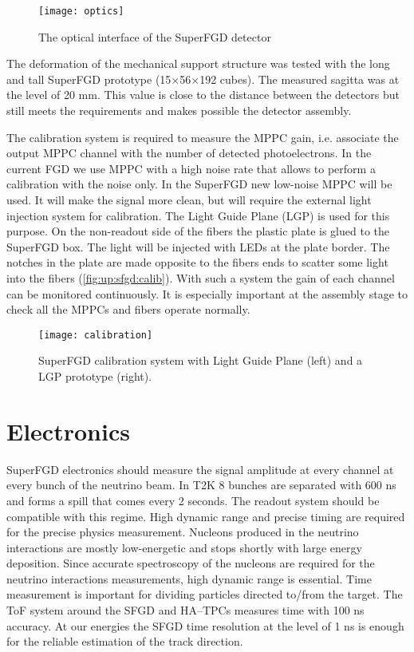 \documentclass[main.tex]{subfiles}
\begin{document}
\begin{figure}[!ht]
	\centering
	\texttt{[image: optics]}
	\caption{The optical interface of the SuperFGD detector}
	\label{fig:up:sfgd:optics}
\end{figure}

The deformation of the mechanical support structure was tested with the long and tall SuperFGD prototype (15$\times$56$\times$192 cubes). The measured sagitta was at the level of 20 mm. This value is close to the distance between the detectors but still meets the requirements and makes possible the detector assembly.

The calibration system is required to measure the MPPC gain, i.e. associate the output MPPC channel with the number of detected photoelectrons. In the current FGD we use MPPC with a high noise rate that allows to perform a calibration with the noise only. In the SuperFGD new low-noise MPPC will be used. It will make the signal more clean, but will require the external light injection system for calibration. The Light Guide Plane (LGP) is used for this purpose. On the non-readout side of the fibers the plastic plate is glued to the SuperFGD box. The light will be injected with LEDs at the plate border. The notches in the plate are made opposite to the fibers ends to scatter some light into the fibers (\autoref{fig:up:sfgd:calib}). With such a system the gain of each channel can be monitored continuously. It is especially important at the assembly stage to check all the MPPCs and fibers operate normally.

\begin{figure}[!ht]
	\centering
	\texttt{[image: calibration]}
	\caption{SuperFGD calibration system with Light Guide Plane (left) and a LGP prototype (right).}
	\label{fig:up:sfgd:calib}
\end{figure}

\section{Electronics}
\label{sec:up:sfgd:ele}
SuperFGD electronics should measure the signal amplitude at every channel at every bunch of the neutrino beam. In T2K 8 bunches are separated with 600 ns and forms a spill that comes every 2 seconds. The readout system should be compatible with this regime. High dynamic range and precise timing are required for the precise physics measurement. Nucleons produced in the neutrino interactions are mostly low-energetic and stops shortly with large energy deposition. Since accurate spectroscopy of the nucleons are required for the neutrino interactions measurements, high dynamic range is essential. Time measurement is important for dividing particles directed to/from the target. The ToF system around the SFGD and HA--TPCs measures time with 100 ns accuracy. At our energies the SFGD time resolution at the level of 1 ns is enough for the reliable estimation of the track direction.
\end{document}

